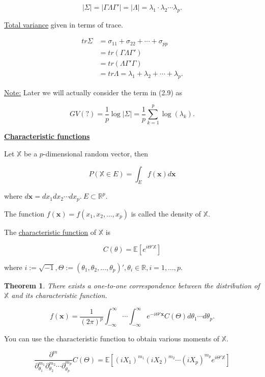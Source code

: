 \documentclass[twoside]{article}
\newcounter{lecnum}
\newtheorem{theorem}{Theorem}[lecnum]
\begin{document}
\begin{equation}
	|\Sigma|=|\Gamma\Lambda\Gamma'|=|\Lambda|=\lambda_1\cdot\lambda_2\cdots\lambda_p.
\end{equation}

\underline{Total variance} given in terms of trace.

\begin{equation}
	\begin{split}
		tr\Sigma&=\sigma_{11}+\sigma_{22}+\cdots+\sigma_{pp}\\
		&=tr(\Gamma\Lambda\Gamma')\\
		&=tr(\Lambda\Gamma'\Gamma)\\
		&=tr\Lambda=\lambda_1+\lambda_2+\cdots +\lambda_p.
	\end{split}
\end{equation}

\underline{Note:} Later we will actually consider the term in (2.9) as

$$GV(?)=\frac{1}{p}\log|\Sigma|=\frac{1}{p}\sum^p_{k=1}\log(\lambda_k).$$

\underline{\textbf{Characteristic functions}}

Let $\mathbb{X}$ be a $p$-dimensional random vector, then

$$P(\mathbb{X}\in E)=\int_{E}f(\mathbf{x})d\mathbf{x}$$

where $d\mathbf{x}=dx_1dx_2\cdots dx_p.\ E\subset \mathbb{R}^p.$

The function $f(\mathbf{x})=f(x_1,x_2,\dots,x_p)$ is called the density of $\mathbb{X}$.

The \underline{characteristic function} of $\mathbb{X}$ is

$$C(\theta)=\mathbb{E}\left[e^{i\Theta'\mathbb{X}}\right]$$

where $i:=\sqrt{-1}, \Theta:=(\theta_1,\theta_2,\dots,\theta_p)', \theta_i\in\mathbb{R}, i=1,\dots, p.$

\begin{theorem}
	There exists a one-to-one correspondence between the distribution of $\mathbb{X}$ and its characteristic function.
	
	$$f(\mathbf{x})=\frac{1}{(2\pi)^p}\int^\infty_{-\infty}\cdots \int^\infty_{-\infty} e^{-i\Theta'\mathbf{x}}C(\Theta)d\theta_1\cdots d\theta_p.$$
\end{theorem}

You can use the characteristic function to obtain various moments of $\mathbb{X}$.

$$\frac{\partial^m}{\partial^{m_1}_{\theta_1}\partial^{m_2}_{\theta_2}\cdots\partial^{m_p}_{\theta_p}}C(\Theta)=\mathbb{E}\left[(iX_1)^{m_1}(iX_2)^{m_2}\cdots(iX_p)^{m_p}e^{i\Theta'\mathbb{X}}\right]$$
\end{document}

